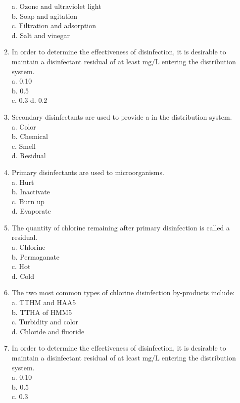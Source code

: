 \begin{enumerate}[1.]
a. Ozone and ultraviolet light\\
b. Soap and agitation\\
c. Filtration and adsorption\\
d. Salt and vinegar\\
\item In order to determine the effectiveness of disinfection, it is desirable to maintain a disinfectant residual of at least $\mathrm{mg} / \mathrm{L}$ entering the distribution system.\\
a. 0.10\\
b. 0.5\\
c. 0.3 d. 0.2\\
\item Secondary disinfectants are used to provide a in the distribution system.\\
a. Color\\
b. Chemical\\
c. Smell\\
d. Residual\\
\item Primary disinfectants are used to microorganisms.\\
a. Hurt\\
b. Inactivate\\
c. Burn up\\
d. Evaporate\\
\item The quantity of chlorine remaining after primary disinfection is called a residual.\\
a. Chlorine\\
b. Permaganate\\
c. Hot\\
d. Cold\\
\item The two most common types of chlorine disinfection by-products include:\\
a. TTHM and HAA5\\
b. TTHA of HMM5\\
c. Turbidity and color\\
d. Chloride and fluoride\\
\item In order to determine the effectiveness of disinfection, it is desirable to maintain a disinfectant residual of at least $\mathrm{mg} / \mathrm{L}$ entering the distribution system.\\
a. 0.10\\
b. 0.5\\
c. 0.3\\

\end{enumerate}

